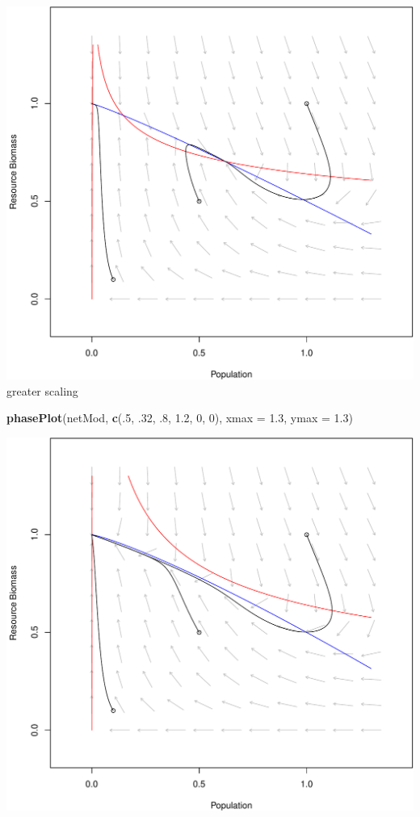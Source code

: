 \documentclass[]{article}
\newenvironment{Shaded}{\begin{snugshade}}{\end{snugshade}}
\newcommand{\KeywordTok}[1]{\textcolor[rgb]{0.13,0.29,0.53}{\textbf{{#1}}}}
\newcommand{\DataTypeTok}[1]{\textcolor[rgb]{0.13,0.29,0.53}{{#1}}}
\newcommand{\DecValTok}[1]{\textcolor[rgb]{0.00,0.00,0.81}{{#1}}}
\newcommand{\FloatTok}[1]{\textcolor[rgb]{0.00,0.00,0.81}{{#1}}}
\newcommand{\NormalTok}[1]{{#1}}
\begin{document}
\includegraphics{consumerresource_files/figure-latex/unnamed-chunk-7-1.pdf}
greater scaling

\begin{Shaded}
\begin{Highlighting}[]
\KeywordTok{phasePlot}\NormalTok{(netMod, }\KeywordTok{c}\NormalTok{(.}\DecValTok{5}\NormalTok{, .}\DecValTok{32}\NormalTok{, .}\DecValTok{8}\NormalTok{, }\FloatTok{1.2}\NormalTok{, }\DecValTok{0}\NormalTok{, }\DecValTok{0}\NormalTok{), }\DataTypeTok{xmax =} \FloatTok{1.3}\NormalTok{, }\DataTypeTok{ymax =} \FloatTok{1.3}\NormalTok{)}
\end{Highlighting}
\end{Shaded}

\includegraphics{consumerresource_files/figure-latex/unnamed-chunk-8-1.pdf}
\end{document}
